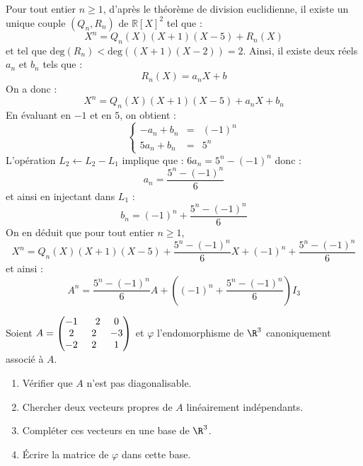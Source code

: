 \documentclass[a4paper,10pt]{report}
\begin{document}
\medskip

\noindent Pour tout entier $n \geq 1$, d'après le théorème de division euclidienne, il existe un unique couple $(Q_n,R_n)$ de $\mathbb{R}[X]^2$ tel que :
$$ X^n = Q_n(X) (X+1)(X-5) + R_n(X)$$
et tel que $\textrm{deg}(R_n)<\textrm{deg}((X+1)(X-2))=2$. Ainsi, il existe deux réels $a_n$ et $b_n$ tels que :
$$ R_n(X)= a_n X + b$$
On a donc :
$$ X^n = Q_n(X) (X+1)(X-5) + a_n X + b_n$$
En évaluant en $-1$ et en $5$, on obtient :
$$ \left\lbrace \begin{array}{ccl}
-a_n + b_n & = & (-1)^n \\
5a_n + b_n & = & 5^n
\end{array}\right.$$
L'opération $L_2 \leftarrow L_2- L_1$ implique que : $6 a_n = 5^n - (-1)^n$ donc :
$$ a_n = \dfrac{5^n-(-1)^n}{6}$$
et ainsi en injectant dans $L_1$ :
$$ b_n = (-1)^n + \dfrac{5^n-(-1)^n}{6}$$
On en déduit que pour tout entier $n \geq 1$,
$$ X^n = Q_n(X) (X+1)(X-5) +\dfrac{5^n-(-1)^n}{6}  X + (-1)^n + \dfrac{5^n-(-1)^n}{6}$$
et ainsi :
$$ A^n = \dfrac{5^n-(-1)^n}{6}  A + \left((-1)^n + \dfrac{5^n-(-1)^n}{6}\right) I_3$$


\begin{Exa} Soient $A = \begin{pmatrix} -1 &\phantom-2 & 0 \cr 2 &2 &-3 \cr -2 &2 &1 \cr \end{pmatrix}$ et $\varphi$ l'endomorphisme de $\R^3$ canoniquement associé à $A$.

\begin{enumerate}
  \item Vérifier que $A$ n'est pas diagonalisable.
    
  \item Chercher deux vecteurs propres de $A$ linéairement indépendants.
    
  \item Compléter ces vecteurs en une base de $\R^3$.
    
  \item \'Ecrire la matrice de $\varphi$ dans cette base.
        
\end{enumerate}
\end{Exa} 

\corr
\end{document}
